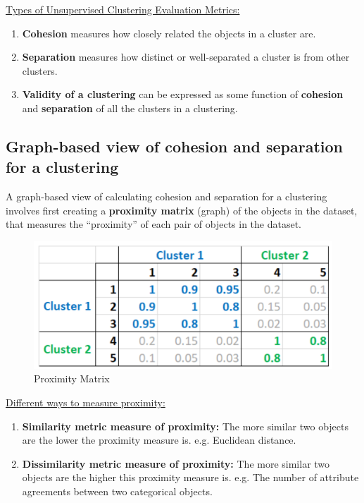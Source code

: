 \documentclass[11pt]{elegantbook}
\begin{document}
\underline{Types of Unsupervised Clustering Evaluation Metrics:}
\begin{enumerate}
    \item \textbf{Cohesion} measures how closely related the objects in a cluster are.
    \item \textbf{Separation} measures how distinct or well-separated a cluster is from other clusters.
    \item \textbf{Validity of a clustering} can be expressed as some function of \textbf{cohesion} and \textbf{separation} of all the clusters in a clustering.
\end{enumerate}

\subsection{Graph-based view of cohesion and separation for a clustering}
A graph-based view of calculating cohesion and separation for a clustering involves first creating a \textbf{proximity matrix} (graph) of the objects in the dataset, that measures the “proximity” of each pair of objects in the dataset.
\begin{center}\begin{figure}[htbp]
    \centering
    \includegraphics[scale=0.18]{proximity matrix.png}
    \caption{Proximity Matrix}
    \label{}
\end{figure}\end{center}
\underline{Different ways to measure proximity:}
\begin{enumerate}
    \item \textbf{Similarity metric measure of proximity:} The more similar two objects are the lower the proximity measure is. e.g. Euclidean distance.
    \item \textbf{Dissimilarity metric measure of proximity:} The more similar two objects are the higher this proximity measure is. e.g. The number of attribute agreements between two categorical objects.
\end{enumerate}
\end{document}
